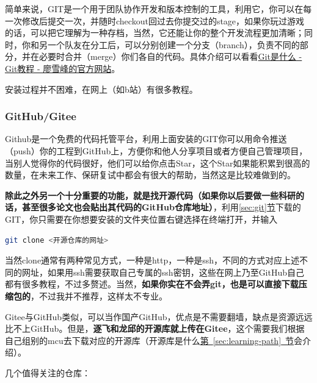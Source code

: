 \documentclass[a4paper,12pt]{article}
\begin{document}
简单来说，GIT是一个用于团队协作开发和版本控制的工具，利用它，你可以在每一次修改后提交一次，并随时checkout回过去你提交过的stage，如果你玩过游戏的话，可以把它理解为一种存档，当然，它还能让你的整个开发流程更加清晰；同时，你和另一个队友在分工后，可以分别创建一个分支（branch），负责不同的部分，并在必要时合并（merge）你们各自的代码。具体介绍可以看看\href{https://liaoxuefeng.com/books/git/what-is-git/index.html}{Git是什么 - Git教程 - 廖雪峰的官方网站}。

安装过程并不困难，在网上（如b站）有很多教程。

\subsubsection{GitHub/Gitee}

Github是一个免费的代码托管平台，利用上面安装的GIT你可以用命令推送（push）你的工程到GitHub上，方便你和他人分享项目或者方便自己管理项目，当别人觉得你的代码很好，他们可以给你点击Star，这个Star如果能积累到很高的数量，在未来工作、保研复试中都会有很大的帮助，当然这是比较难做到的。

\textbf{除此之外另一个十分重要的功能，就是找开源代码（如果你以后要做一些科研的话，甚至很多论文也会贴出其代码的GitHub仓库地址）}，利用\hyperref[sec:git]{\ref*{sec:git}节}下载的GIT，你只需要在你想要安装的文件夹位置右键选择在终端打开，并输入

\begin{lstlisting}[language=bash]
git clone <开源仓库的网址>
\end{lstlisting}

当然clone通常有两种常见方式，一种是http，一种是ssh，不同的方式对应上述不同的网址，如果用ssh需要获取自己专属的ssh密钥，这些在网上乃至GitHub自己都有很多教程，不过多赘述。当然，\textbf{如果你实在不会弄git，也是可以直接下载压缩包的}，不过我并不推荐，这样太不专业。

Gitee与GitHub类似，可以当作国产GitHub，优点是不需要翻墙，缺点是资源远远比不上GitHub。但是，\textbf{逐飞和龙邱的开源库就上传在Gitee}，这个需要我们根据自己组别的mcu去下载对应的开源库（开源库是什么\hyperref[sec:learning-path]{第~\ref*{sec:learning-path}~节}会介绍）。

几个值得关注的仓库：
\end{document}
